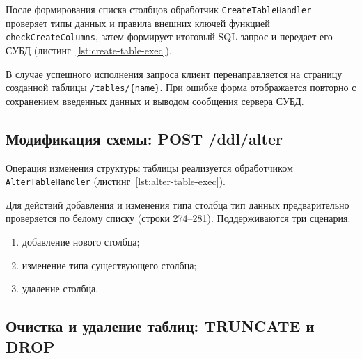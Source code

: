 \begin{listing}[H]
    \caption{Разбор ссылок внешних ключей в \texttt{handlers\_ddl.go}}
    \label{lst:parse-fk}
\end{listing}

После формирования списка столбцов обработчик \texttt{CreateTableHandler} проверяет типы данных и правила внешних ключей функцией \texttt{checkCreateColumns}, затем формирует итоговый SQL-запрос и передает его СУБД (листинг~\ref{lst:create-table-exec}).

\begin{listing}[H]
    \caption{Сборка и выполнение запроса \texttt{CREATE TABLE}}
    \label{lst:create-table-exec}
\end{listing}

В случае успешного исполнения запроса клиент перенаправляется на страницу созданной таблицы \texttt{/tables/\{name\}}. При ошибке форма отображается повторно с сохранением введенных данных и выводом сообщения сервера СУБД.

\subsection{Модификация схемы: POST /ddl/alter}

Операция изменения структуры таблицы реализуется обработчиком \texttt{AlterTableHandler} (листинг~\ref{lst:alter-table-exec}).

\begin{listing}[H]
    \caption{Сборка и исполнение команд \texttt{ALTER TABLE}}
    \label{lst:alter-table-exec}
\end{listing}

Для действий добавления и изменения типа столбца тип данных предварительно проверяется по белому списку (строки 274--281). Поддерживаются три сценария:
\begin{enumerate}
    \item добавление нового столбца;
    \item изменение типа существующего столбца;
    \item удаление столбца.
\end{enumerate}

\subsection{Очистка и удаление таблиц: TRUNCATE и DROP}

